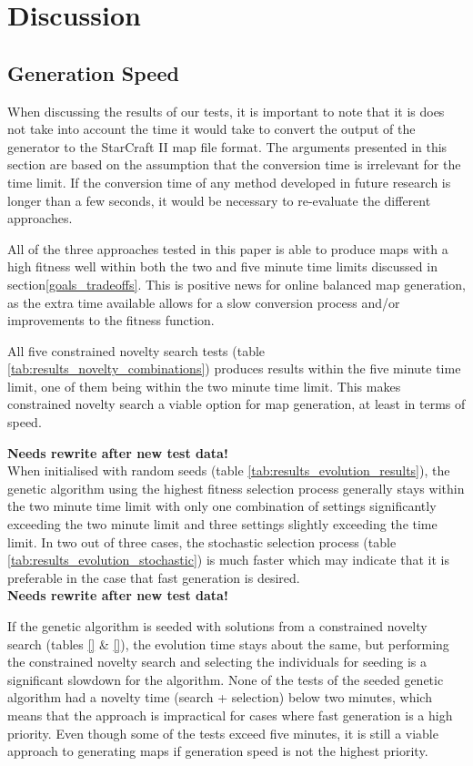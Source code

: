 \chapter{Discussion}
\label{discussion_quality}

\section{Generation Speed}
\label{discussion_speed}
When discussing the results of our tests, it is important to note that it is does not take into account the time it would take to convert the output of the generator to the StarCraft II map file format. The arguments presented in this section are based on the assumption that the conversion time is irrelevant for the time limit. If the conversion time of any method developed in future research is longer than a few seconds, it would be necessary to re-evaluate the different approaches.

All of the three approaches tested in this paper is able to produce maps with a high fitness well within both the two and five minute time limits discussed in section\ref{goals_tradeoffs}. This is positive news for online balanced map generation, as the extra time available allows for a slow conversion process and/or improvements to the fitness function.

All five constrained novelty search tests (table \ref{tab:results_novelty_combinations}) produces results within the five minute time limit, one of them being within the two minute time limit. This makes constrained novelty search a viable option for map generation, at least in terms of speed.

\textbf{Needs rewrite after new test data!}
\\When initialised with random seeds (table \ref{tab:results_evolution_results}), the genetic algorithm using the highest fitness selection process generally stays within the two minute time limit with only one combination of settings significantly exceeding the two minute limit and three settings slightly exceeding the time limit. In two out of three cases, the stochastic selection process (table \ref{tab:results_evolution_stochastic}) is much faster which may indicate that it is preferable in the case that fast generation is desired. 
\\\textbf{Needs rewrite after new test data!}

If the genetic algorithm is seeded with solutions from a constrained novelty search (tables \ref{} \& \ref{}), the evolution time stays about the same, but performing the constrained novelty search and selecting the individuals for seeding is a significant slowdown for the algorithm. None of the tests of the seeded genetic algorithm had a novelty time (search + selection) below two minutes, which means that the approach is impractical for cases where fast generation is a high priority. Even though some of the tests exceed five minutes, it is still a viable approach to generating maps if generation speed is not the highest priority.

